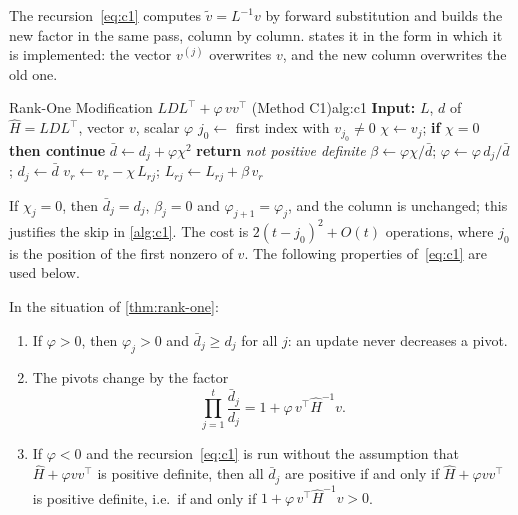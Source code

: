 The recursion~\eqref{eq:c1} computes $\tilde v = L^{-1}v$ by forward substitution and builds the
new factor in the same pass, column by column.  states it in the form in which it
is implemented: the vector $v^{(j)}$ overwrites $v$, and the new column overwrites the old one.

\begin{algobox}{Rank-One Modification $LDL^\top + \varphi\,vv^\top$ (Method C1)}{alg:c1}
\State \textbf{Input:} $L$, $d$ of $\hat H = LDL^\top$, vector $v$, scalar $\varphi$
\State $j_0\gets$ first index with $v_{j_0}\ne0$ 
    \State $\chi\gets v_j$; \textbf{if} $\chi = 0$ \textbf{then continue} 
    \State $\bar d\gets d_j + \varphi\chi^2$
     \textbf{return} \emph{not positive definite} \EndIf
    \State $\beta\gets\varphi\chi/\bar d$; \;$\varphi\gets\varphi\,d_j/\bar d$; \;$d_j\gets\bar d$
        \State $v_r\gets v_r - \chi\,L_{rj}$; \;$L_{rj}\gets L_{rj} + \beta\,v_r$
    \EndFor
\EndFor
\end{algobox}

If $\chi_j = 0$, then $\bar d_j = d_j$, $\beta_j = 0$ and $\varphi_{j+1} = \varphi_j$, and the column is
unchanged; this justifies the skip in \cref{alg:c1}. The cost is $2(t - j_0)^2 + O(t)$
operations, where $j_0$ is the position of the first nonzero of $v$. The following properties
of~\eqref{eq:c1} are used below.

\begin{prop} \label{prop:c1-pivots}
In the situation of \cref{thm:rank-one}:
\begin{enumerate}
    \item \label{prop:c1-pivots:i} If $\varphi>0$, then $\varphi_j>0$ and $\bar d_j\ge d_j$ for all $j$: an update never
          decreases a pivot.
    \item \label{prop:c1-pivots:ii} The pivots change by the factor
          \[
          \prod_{j=1}^{t}\frac{\bar d_j}{d_j} = 1 + \varphi\,v^\top\hat H^{-1}v .
          \]
    \item \label{prop:c1-pivots:iii} If $\varphi<0$ and the recursion~\eqref{eq:c1} is run without the assumption that
          $\hat H + \varphi vv^\top$ is positive definite, then all $\bar d_j$ are positive if and only if
          $\hat H + \varphi vv^\top$ is positive definite, i.e.\ if and only if
          $1 + \varphi\,v^\top\hat H^{-1}v>0$.
\end{enumerate}
\end{prop}


